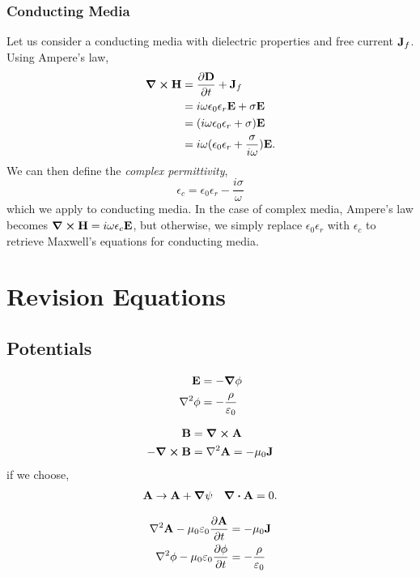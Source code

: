 \documentclass{book}
\begin{document}
\subsection{Conducting Media}
Let us consider a conducting media with dielectric properties and free current $\vb{J}_f$. Using Ampere's law,
\begin{equation}
	\begin{split}
		\curl{\vb{H}} & = \pdv{\vb{D}}{t} + \vb{J}_f \\
		& = i \omega \epsilon_0\epsilon_r \vb{E} + \sigma \vb{E} \\
		& = (i\omega \epsilon_0\epsilon_r + \sigma)\vb{E} \\
		& = i\omega(\epsilon_0\epsilon_r + \frac{\sigma}{i\omega})\vb{E}.
	\end{split}
\end{equation}
We can then define the \textit{complex permittivity},
\begin{equation}
	\epsilon_c = \epsilon_0\epsilon_r - \frac{i\sigma}{\omega}
\end{equation}
which we apply to conducting media. In the case of complex media, Ampere's law becomes $\curl{\vb{H}} = i\omega\epsilon_c\vb{E}$, but otherwise, we simply replace $\epsilon_0\epsilon_r$ with $\epsilon_c$ to retrieve Maxwell's equations for conducting media.
\appendix

\chapter{Revision Equations}

\section{Potentials}
\begin{tcolorbox}[colback=red!5!white,colframe=red!75!black,title=Static Electric Potential]
	\begin{align}
		\vb{E} &= - \grad \phi \\
		\laplacian{\phi} &= - \frac{\rho}{\varepsilon_0}
	\end{align}
\end{tcolorbox}
\begin{tcolorbox}[colback=blue!5!white,colframe=blue!75!black,title=Static Magnetic Potential]
	\begin{align}
		\vb{B} &= \curl{\vb{A}} \\
		-\curl{\vb{B}} &= \laplacian{\vb{A}} = - \mu_0 \vb{J}
	\end{align} 
	if we choose,
	\begin{align}
		\vb{A} \to \vb{A} + \grad{\psi} && \div{\vb{A}} = 0.
	\end{align}
\end{tcolorbox}
\begin{tcolorbox}[colback=green!5!white,colframe=green!75!black,title=Dynamic Potentials]
	\begin{align}
		\laplacian\vb{A} - \mu_0\varepsilon_0 \pdv{\vb{A}}{t} &= - \mu_0 \vb{J} \label{eq:A} \\
		\laplacian\vb{\phi} - \mu_0\varepsilon_0\pdv{\phi}{t} &= -\frac{\rho}{\varepsilon_0} \label{eq:phi}
	\end{align}
\end{tcolorbox}
\end{document}
